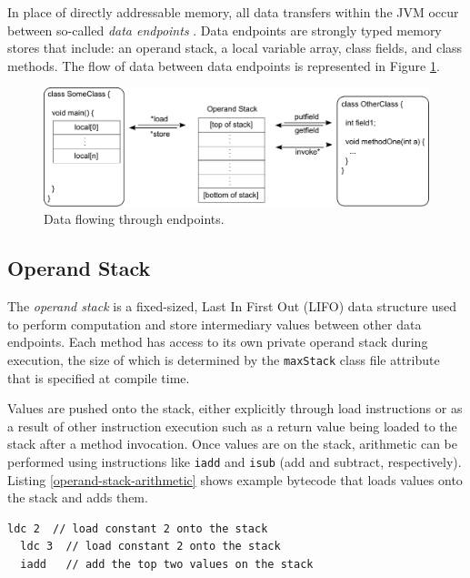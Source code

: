 In place of directly addressable memory, all data transfers within the JVM occur between so-called \emph{data endpoints} \cite{nutter-jax2012}.  Data endpoints are strongly typed memory stores that include: an operand stack, a local variable array, class fields, and class methods.  The flow of data between data endpoints is represented in Figure \ref{fig:data-endpoints}.

\begin{figure}[htbp]
  \centering
    \includegraphics[width=\textwidth]{./Figures/stack-paths.pdf}
  \caption[Data Endpoints]{Data flowing through endpoints.}
	\label{fig:data-endpoints}
\end{figure}

\subsection{Operand Stack}

The \emph{operand stack} is a fixed-sized, Last In First Out (LIFO) data structure \cite[2.6.2]{jvms7} used to perform computation and store intermediary values between other data endpoints.  Each method has access to its own private operand stack during execution, the size of which is determined by the \texttt{maxStack} class file attribute that is specified at compile time.

Values are pushed onto the stack, either explicitly through load instructions or as a result of other instruction execution such as a return value being loaded to the stack after a method invocation.  Once values are on the stack, arithmetic can be performed using instructions like \texttt{iadd} and \texttt{isub} (add and subtract, respectively).  Listing \ref{operand-stack-arithmetic} shows example bytecode that loads values onto the stack and adds them.

\begin{lstlisting}[language=jvm-bytecode,caption=Operand stack arithmetic,label=operand-stack-arithmetic]
  ldc 2  // load constant 2 onto the stack
  ldc 3  // load constant 2 onto the stack
  iadd   // add the top two values on the stack
\end{lstlisting}


